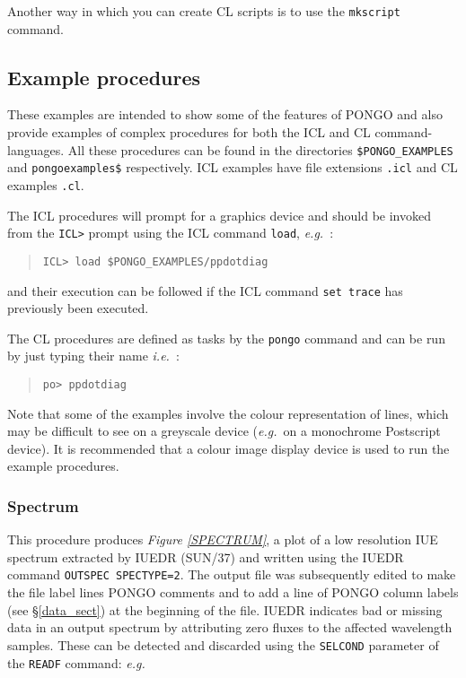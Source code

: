 \documentclass[twoside,11pt]{article}
\newcommand{\htmlref}[2]{#1}
\newcommand{\xref}[3]{#1}
\renewcommand{\_}{\texttt{\symbol{95}}}
\newcommand{\eg}{{\em e.g.\ }}
\newcommand{\ie}{{\em i.e.\ }}
\newcommand{\pnam}[1]{{\tt #1}}
\newcommand{\cnam}[1]{{\tt #1}}
\newcommand{\iref} [1]{\htmlref{#1}{#1}}
\begin{document}
Another way in which you can create CL scripts is to use the
\verb+mkscript+ command.

\subsection{Example procedures} \label{exam_sect}

These examples are intended to show some of the features of PONGO and
also provide examples of complex procedures for both the ICL and CL
command-languages. All these procedures can be
found in the directories \verb+$PONGO_EXAMPLES+  and
\verb+pongoexamples$+ respectively. ICL examples have file extensions
\verb+.icl+ and CL examples \verb+.cl+.

The ICL procedures will prompt for a graphics device and should be
invoked from the \verb+ICL>+ prompt using the ICL command \verb+load+, \eg:
\begin {quote}
\begin{verbatim}
ICL> load $PONGO_EXAMPLES/ppdotdiag
\end{verbatim}
\end {quote}
and their execution can be followed if the ICL command \verb+set trace+ has
previously been executed.

The CL procedures are defined as tasks by the \verb+pongo+ command and
can be run by just typing their name \ie:
\begin{quote}
\begin{verbatim}
po> ppdotdiag
\end{verbatim}
\end{quote}

Note that some of the examples involve the colour representation of lines,
which may be difficult to see on a greyscale device (\eg on a monochrome
Postscript device).
It is recommended that a colour image display device is used to run the
example procedures.

\newpage

\subsubsection{Spectrum}

This procedure produces {\em Figure \ref{SPECTRUM}}, a plot of a
low resolution
IUE spectrum extracted by \xref{IUEDR (SUN/37)}{sun37}{} and written using the
IUEDR command \verb+OUTSPEC SPECTYPE=2+.
The output file was subsequently edited to make the file label lines PONGO
comments and to add a line of PONGO column labels (see \S\ref{data_sect})
at the beginning of the file.
IUEDR indicates bad or missing data in an output spectrum by attributing zero
fluxes to the affected wavelength samples.
These can be detected and discarded using the \pnam{SELCOND} parameter of
the \cnam{\iref{READF}} command: \eg
\end{document}
